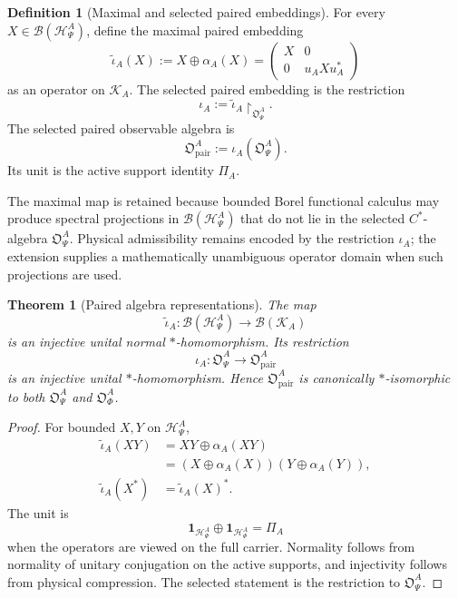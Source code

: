 \documentclass[11pt,reqno]{scrartcl}
\newcommand{\idop}{\mathbf 1}
\newcommand{\polA}{u_A}
\newcommand{\PiA}{\Pi_{A}}
\newcommand{\restr}[2]{#1\!\upharpoonright_{#2}}
\newcommand{\actHP}{\mathscr H_{\Psi}^{A}}
\newcommand{\actHF}{\mathscr H_{\Phi}^{A}}
\newcommand{\actK}{\mathscr K_{A}}
\newcommand{\alphaA}{\alpha_{A}}
\newcommand{\iotaA}{\iota_{A}}
\newcommand{\iotaMaxA}{\widetilde{\iota}_{A}}
\newcommand{\obsP}{\mathfrak O_{\Psi}^{A}}
\newcommand{\obsF}{\mathfrak O_{\Phi}^{A}}
\newcommand{\obsPair}{\mathfrak O_{\mathrm{pair}}^{A}}
\theoremstyle{plain}
\newtheorem{theorem}{Theorem}[section]
\theoremstyle{definition}
\newtheorem{definition}[definition]{Definition}
\theoremstyle{remark}
\begin{document}
\begin{definition}[Maximal and selected paired embeddings]
\label{def:paired-observable-embedding}
For every $X\in\mathcal B(\actHP)$, define the maximal paired embedding
\begin{equation}
  \boxed{
  \iotaMaxA(X)
  :=X\oplus\alphaA(X)
  =\begin{pmatrix}
      X&0\\
      0&\polA X\polA^*
    \end{pmatrix}}
  \label{eq:iotaA-maximal-definition}
\end{equation}
as an operator on $\actK$.  The selected paired embedding is the restriction
\begin{equation}
  \boxed{
  \iotaA:=\restr{\iotaMaxA}{\obsP}.}
  \label{eq:iotaA-definition}
\end{equation}
The selected paired observable algebra is
\begin{equation}
  \boxed{
  \obsPair:=\iotaA(\obsP).}
  \label{eq:paired-observable-algebra-definition}
\end{equation}
Its unit is the active support identity $\PiA$.
\end{definition}

The maximal map is retained because bounded Borel functional calculus may
produce spectral projections in $\mathcal B(\actHP)$ that do not lie in the
selected $C^*$-algebra $\obsP$.  Physical admissibility remains encoded by the
restriction $\iotaA$; the extension supplies a mathematically unambiguous
operator domain when such projections are used.

\begin{theorem}[Paired algebra representations]
\label{thm:paired-algebra-representation}
The map
\begin{equation}
  \iotaMaxA:\mathcal B(\actHP)\longrightarrow\mathcal B(\actK)
  \label{eq:iotaA-maximal-map}
\end{equation}
is an injective unital normal $*$-homomorphism.  Its restriction
\begin{equation}
  \iotaA:\obsP\longrightarrow\obsPair
  \label{eq:iotaA-map}
\end{equation}
is an injective unital $*$-homomorphism.  Hence $\obsPair$ is canonically
$*$-isomorphic to both $\obsP$ and $\obsF$.
\end{theorem}

\begin{proof}
For bounded $X,Y$ on $\actHP$,
\begin{align}
  \iotaMaxA(XY)
  &=XY\oplus\alphaA(XY)\\
  &=(X\oplus\alphaA(X))(Y\oplus\alphaA(Y)),\\
  \iotaMaxA(X^*)&=\iotaMaxA(X)^*.
\end{align}
The unit is
\begin{equation}
  \idop_{\actHP}\oplus\idop_{\actHF}=\PiA
\end{equation}
when the operators are viewed on the full carrier.  Normality follows from
normality of unitary conjugation on the active supports, and injectivity
follows from physical compression.  The selected statement is the
restriction to $\obsP$.
\end{proof}
\end{document}
